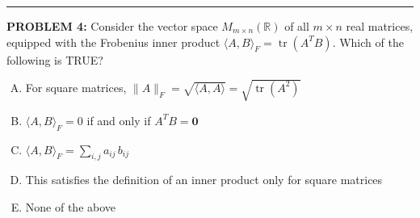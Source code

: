 \documentclass[12pt]{amsart}
\newcommand{\divider}{
  \vspace{-1em} %
  \noindent
  \raisebox{-0.15ex}{\textbullet}%
  \hspace{0.5em}%
  \rule[0.5ex]{0.95\textwidth}{1.0pt}%
  \hspace{0.5em}%
  \raisebox{-0.15ex}{\textbullet}%
  \vspace{0em} %
}
\begin{document}

\divider

\newpage


{\bf PROBLEM 4:}
%
Consider the vector space $M_{m \times n}(\mathbb{R})$ of all $m \times n$ real matrices, equipped with the Frobenius inner product $\langle A, B \rangle_F = \operatorname{tr}(A^T B)$. Which of the following is TRUE?

\begin{enumerate}[(A)]
\item For square matrices, $\|A\|_F = \sqrt{\langle A, A\rangle} = \sqrt{\operatorname{tr}(A^2)}$
\item $\langle A, B \rangle_F = 0$ if and only if $A^T B = \mathbf{0}$
\item $\langle A, B \rangle_F = \sum_{i,j} a_{ij}\,b_{ij}$
\item This satisfies the definition of an inner product only for square matrices
\item None of the above
\end{enumerate}
\end{document}
